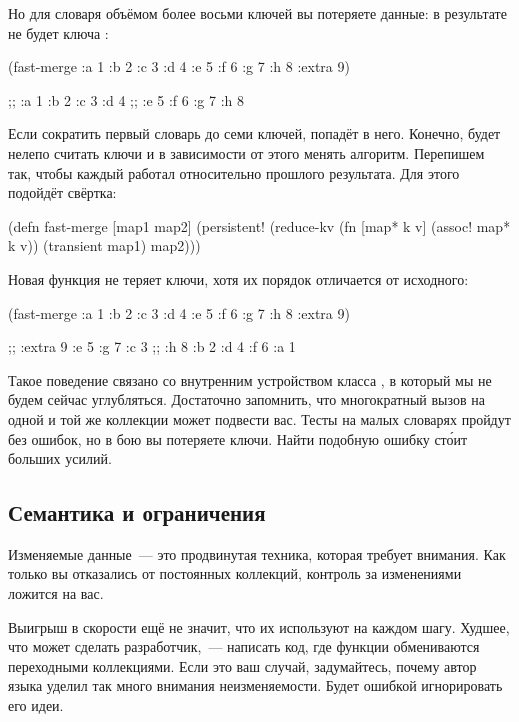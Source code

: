 Но для словаря объёмом более восьми ключей вы потеряете данные: в результате не
будет ключа :

\begin{clojure}
(fast-merge
 {:a 1 :b 2 :c 3 :d 4 :e 5 :f 6 :g 7 :h 8}
 {:extra 9})

;; {:a 1 :b 2 :c 3 :d 4
;;  :e 5 :f 6 :g 7 :h 8}
\end{clojure}

Если сократить первый словарь до семи ключей,  попадёт в
него. Конечно, будет нелепо считать ключи и в зависимости от этого менять
алгоритм. Перепишем  так, чтобы каждый  работал
относительно прошлого результата. Для этого подойдёт свёртка:

\begin{clojure}
(defn fast-merge [map1 map2]
  (persistent!
   (reduce-kv
    (fn [map* k v]
      (assoc! map* k v))
    (transient map1)
    map2)))
\end{clojure}

Новая функция не теряет ключи, хотя их порядок отличается от исходного:

\begin{clojure}
(fast-merge
 {:a 1 :b 2 :c 3 :d 4 :e 5 :f 6 :g 7 :h 8}
 {:extra 9})

;; {:extra 9 :e 5 :g 7 :c 3
;;  :h 8 :b 2 :d 4 :f 6 :a 1}
\end{clojure}

Такое поведение связано со внутренним устройством класса
, в который мы не будем сейчас
углубляться. Достаточно запомнить, что многократный вызов  на одной
и той же коллекции может подвести вас. Тесты на малых словарях пройдут без
ошибок, но в бою вы потеряете ключи. Найти подобную ошибку ст\'{о}ит больших усилий.

\subsection{Семантика и ограничения}

Изменяемые данные~--- это продвинутая техника, которая требует внимания. Как только
вы отказались от постоянных коллекций, контроль за изменениями ложится на вас.

Выигрыш в скорости ещё не значит, что их используют на каждом шагу. Худшее, что
может сделать разработчик,~--- написать код, где функции обмениваются
переходными коллекциями. Если это ваш случай, задумайтесь, почему автор языка
уделил так много внимания неизменяемости. Будет ошибкой игнорировать его идеи.

